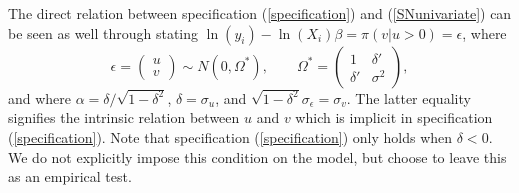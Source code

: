\documentclass[11pt,parskip,abstracton,notitlepage]{scrartcl}
\begin{document}
The direct relation between specification (\ref{specification}) and (\ref{SNunivariate}) can be seen as well through stating $\ln \left(y_i\right)  -\ln \left(X_i\right) \beta = \pi(v|u>0) = \epsilon$, where 
%
\begin{equation}
\epsilon =  \begin{pmatrix} u \\ v \end{pmatrix} \sim N\left(0,\Omega^\ast\right), \qquad \Omega^\ast=\begin{pmatrix} 1 & \delta' \\ \delta' & \sigma^2
\end{pmatrix}, 
\end{equation}
%
and where $\alpha = \delta/\sqrt{1-\delta^2}$, $\delta = \sigma_u$, and $\sqrt{1-\delta^2} \sigma_\epsilon=\sigma_v$. The latter equality signifies the intrinsic relation between $u$ and $v$ which is implicit in specification (\ref{specification}). Note that specification (\ref{specification}) only holds when $\delta < 0$. We do not explicitly impose this condition on the model, but choose to leave this as an empirical test. 
\end{document}

